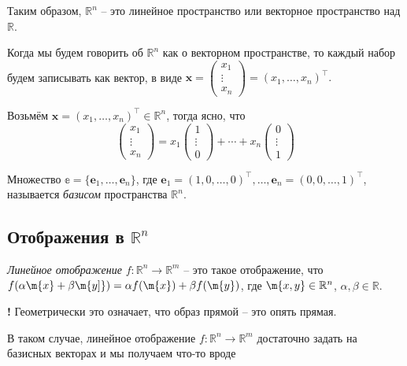 Таким образом, $\mathbb{R}^n$ -- это линейное пространство или векторное пространство над $\mathbb{R}$.

Когда мы будем говорить об $\mathbb{R}^n$ как о векторном пространстве, то каждый набор будем записывать как вектор, \ie в виде $\mathbf{x} = \begin{pmatrix} x_1 \\ \vdots \\ x_n \end{pmatrix} = (x_1,\ldots, x_n)^\top.$

Возьмём $\mathbf{x} = (x_1,\ldots, x_n)^\top \in \mathbb{R}^n$, тогда ясно, что 
\[
\begin{pmatrix}
    x_1 \\ \vdots \\x_n 
\end{pmatrix} = x_1 \begin{pmatrix}
    1 \\ \vdots \\ 0
\end{pmatrix} + \cdots + x_n \begin{pmatrix}
    0 \\ \vdots \\1
\end{pmatrix}
\]

Множество $\mathbb{e} = \{\mathbf{e}_1, \ldots, \mathbf{e}_n\}$, где $\mathbf{e}_1 = (1,0, \ldots, 0)^\top, \ldots, \mathbf{e}_n = (0,0,\ldots, 1)^\top$, называется \textit{базисом} пространства $\mathbb{R}^n.$

\subsection{Отображения в $\mathbb{R}^n$}

\textit{Линейное отображение} $f:\mathbb{R}^n \to \mathbb{R}^m$ -- это такое отображение, что $f(\alpha \m{x} +\beta \m{y]} ) = \alpha f(\m{x}) +\beta f(\m{y})$, где $\m{x,y} \in \mathbb{R}^n$, $\alpha, \beta \in \mathbb{R}.$ 

\begin{mydanger}{\bf{!}}
    Геометрически это означает, что образ прямой -- это опять прямая.
\end{mydanger}

В таком случае, линейное отображение $f:\mathbb{R}^n \to \mathbb{R}^m$ достаточно задать на базисных векторах и мы получаем что-то вроде

